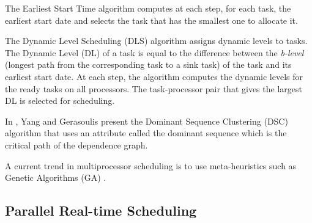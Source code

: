 The Earliest Start Time algorithm \cite{hwang:1989} computes at each step, for each task, the earliest start date and selects the task that has the smallest one to allocate it. 

The Dynamic Level Scheduling (DLS) algorithm \cite{sih:1993} assigns dynamic levels to tasks. The Dynamic Level (DL) of a task is equal to the difference between the \textit{b-level} (longest path from the corresponding task to a sink task) of the task and its earliest start date. At each step, the algorithm computes the dynamic levels for the ready tasks on all processors. The task-processor pair that gives the largest DL is selected for scheduling. 

In \cite{yang:1994}, Yang and Gerasoulis present the Dominant Sequence Clustering (DSC) algorithm that uses an attribute called the dominant sequence which is the critical path of the dependence graph.

A current trend in multiprocessor scheduling is to use meta-heuristics such as Genetic Algorithms (GA) \cite{hou:1994, wu:2004, omara:2010}.

\subsection{Parallel Real-time Scheduling}

